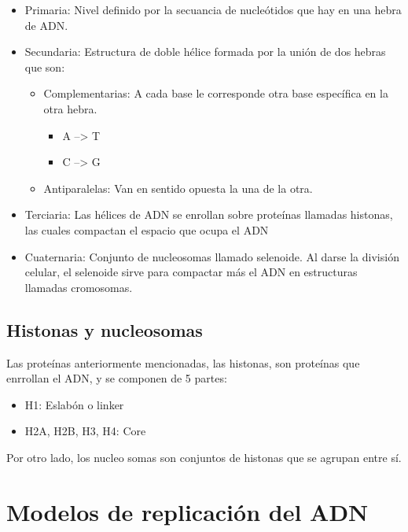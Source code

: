 \begin{itemize}
    \item Primaria: Nivel definido por la secuancia de nucleótidos que hay en una hebra de ADN.
    
    \item Secundaria: Estructura de doble hélice formada por la unión de dos hebras que son:
	    \begin{itemize}
	        \item Complementarias: A cada base le corresponde otra base específica en la otra hebra.
	    	    \begin{itemize}    
	    	        \item A --> T
	    	        \item C --> G
	    	    \end{itemize}
	        \item Antiparalelas: Van en sentido opuesta la una de la otra.
	    \end{itemize}
    
    \item Terciaria: Las hélices de ADN se enrollan sobre proteínas llamadas histonas, las cuales compactan el espacio que ocupa el ADN

    \item Cuaternaria: Conjunto de nucleosomas llamado selenoide. Al darse la división celular, el selenoide sirve para compactar más el ADN en estructuras llamadas cromosomas.
\end{itemize}

\subsection{Histonas y nucleosomas}

Las proteínas anteriormente mencionadas, las histonas, son proteínas que enrrollan el ADN, y se componen de 5 partes:

\begin{itemize}
    \item H1: Eslabón o linker
    \item H2A, H2B, H3, H4: Core
\end{itemize}

Por otro lado, los nucleo somas son conjuntos de histonas que se agrupan entre sí.

\section{Modelos de replicación del ADN}



